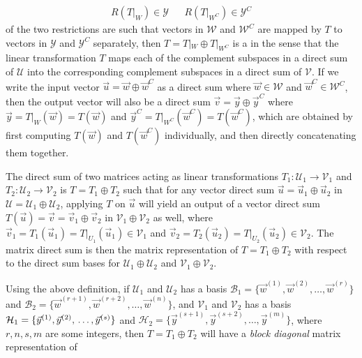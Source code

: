 \begin{align*}
R(T|_W) \in \mathcal{Y} & & R(T|_{W^C}) \in \mathcal{Y}^C
\end{align*}
of the two restrictions are such that vectors in $\mathcal{W}$ and $\mathcal{W}^C$ are mapped by $T$ to vectors in $\mathcal{Y}$ and $\mathcal{Y}^C$ separately, then $T = T|_W \oplus T|_{W^C}$ is a  in the sense that the linear transformation $T$ maps each of the complement subspaces in a direct sum of $\mathcal{U}$ into the corresponding complement subspaces in a direct sum of $\mathcal{V}$. If we write the input vector $\vec{u} = \vec{w} \oplus \vec{w}^C$ as a direct sum where $\vec{w} \in \mathcal{W}$ and $\vec{w}^C \in \mathcal{W}^C$, then the output vector will also be a direct sum $\vec{v} = \vec{y} \oplus \vec{y}^C$ where $\vec{y} = T|_W(\vec{w}) = T(\vec{w})$ and $\vec{y}^C = T|_{W^C}(\vec{w}^C) = T(\vec{w}^C)$, which are obtained by first computing $T(\vec{w})$ and $T(\vec{w}^C)$ individually, and then directly concatenating them together.
\begin{defn}
\label{defn:matdirectsum}
The direct sum of two matrices acting as linear transformations $T_1: \mathcal{U}_1 \to \mathcal{V}_1$ and $T_2: \mathcal{U}_2 \to \mathcal{V}_2$ is $T = T_1 \oplus T_2$ such that for any vector direct sum $\vec{u} = \vec{u}_1 \oplus \vec{u}_2$ in $\mathcal{U} = \mathcal{U}_1 \oplus \mathcal{U}_2$, applying $T$ on $\vec{u}$ will yield an output of a vector direct sum $T(\vec{u}) = \vec{v} = \vec{v}_1 \oplus \vec{v}_2$ in $\mathcal{V}_1 \oplus \mathcal{V}_2$ as well, where $\vec{v}_1 = T_1(\vec{u}_1) = T|_{U_1}(\vec{u}_1) \in \mathcal{V}_1$ and $\vec{v}_2 = T_2(\vec{u}_2) = T|_{U_2}(\vec{u}_2) \in \mathcal{V}_2$. The matrix direct sum is then the matrix representation of $T = T_1 \oplus T_2$ with respect to the direct sum bases for $\mathcal{U}_1 \oplus \mathcal{U}_2$ and $\mathcal{V}_1 \oplus \mathcal{V}_2$.
\end{defn}
Using the above definition, if $\mathcal{U}_1$ and $\mathcal{U}_2$ has a basis $\mathcal{B}_1 = \{\vec{w}^{(1)}, \vec{w}^{(2)}, \ldots, \vec{w}^{(r)}\}$ and $\mathcal{B}_2 = \{\vec{w}^{(r+1)}, \vec{w}^{(r+2)}, \ldots, \vec{w}^{(n)}\}$, and $\mathcal{V}_1$ and $\mathcal{V}_2$ has a basis $\mathcal{H}_1 = \{\vec{y}^{(1)}, \vec{y}^{(2)}, \\ \ldots, \vec{y}^{(s)}\}$ and $\mathcal{H}_2 = \{\vec{y}^{(s+1)}, \vec{y}^{(s+2)}, \ldots, \vec{y}^{(m)}\}$, where $r, n, s, m$ are some integers, then $T = T_1 \oplus T_2$ will have a \textit{block diagonal} matrix representation of
